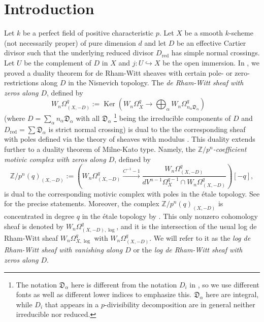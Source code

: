 \documentclass[11pt]{amsart}
\newcommand{\xr}[1] {\xrightarrow{#1}}
\newcommand{\ra}{\rightarrow}
\newcommand{\Z}{\mathbb{Z}}
\newcommand{\sD}{\mathfrak{D}}
\newcommand{\Ker}{\operatorname{Ker}}
\newcommand{\red}{{\operatorname{red}}}
\newcommand{\hra}{\hookrightarrow}
\theoremstyle{plain}
\theoremstyle{definition}
\numberwithin{equation}{prop}
\begin{document}
\section{Introduction}
Let $k$ be a perfect field of positive characteristic $p$.
Let $X$ be a smooth $k$-scheme (not necessarily proper) of pure dimension $d$ and let $D$ be
an effective Cartier divisor such that the underlying reduced divisor $D_{\red}$ has simple normal
crossings.
Let $U$ be the complement of $D$ in $X$ and $j:U\hra X$ be the open immersion.
In \cite{RamFil1}, we proved a duality theorem for de Rham-Witt sheaves with certain pole- or zero-restrictions along $D$ in the Nisnevich topology. 
The \textit{de Rham-Witt sheaf with zeros along $D$}, defined by
$$W_n\Omega^q_{(X,-D)}:=\Ker\left(W_n\Omega^q_X\ra\bigoplus_\alpha W_n\Omega^q_{n_{\alpha} \sD_\alpha}\right)
 \quad$$
(where $D=\sum_\alpha n_{\alpha} \sD_\alpha$ with all $\sD_{\alpha}$
\footnote{The notation $\sD_\alpha$ here is different from the notation $D_i$ in , so we use different fonts as well as different lower indices to emphasize this. $\sD_\alpha$ here are integral, while $D_i$ that appears in a $p$-divisibility decomposition are in general neither irreducible nor reduced. 
 }
being the irreducible components of $D$ and $D_{\red}=\sum \sD_\alpha$ is  strict normal crossing)
is dual to 
the the corresponding sheaf with poles defined via the theory of sheaves with modulus \cite{KMSYI, KMSYII, KMSYIII}.
This duality extends further to a duality theorem of Milne-Kato type.
Namely, the \textit{$\Z/p^n$-coefficient motivic complex with zeros along $D$}, defined by
\[\Z/p^n(q)_{(X,-D)}:=\left(W_n\Omega^q_{(X,-D)}\xr{C^{-1}-1} 
\frac{W_n\Omega^q_{(X,-D)}}{dV^{n-1}\Omega^{q-1}_X\cap W_n\Omega^q_{(X,-D)}}\right)[-q],\]
is dual to the corresponding motivic complex with poles in the \'etale topology.
See \cite[Theorem 11.15]{RamFil1} for the precise statements.
Moreover, the complex $\Z/p^n(q)_{(X,-D)}$ is concentrated in degree $q$ in the \'etale topology by \cite[Lemma 11.6]{RamFil1}. This only nonzero cohomology sheaf is denoted by $W_n\Omega^q_{(X,-D),\log}$, and it is the intersection of the usual log de Rham-Witt sheaf $W_n\Omega^q_{X,\log}$ with 
$W_n\Omega^q_{(X,-D)}$.
We will refer to it as the \textit{log de Rham-Witt sheaf with vanishing along $D$} or the \textit{log de Rham-Witt sheaf with zeros along $D$}.
\end{document}
